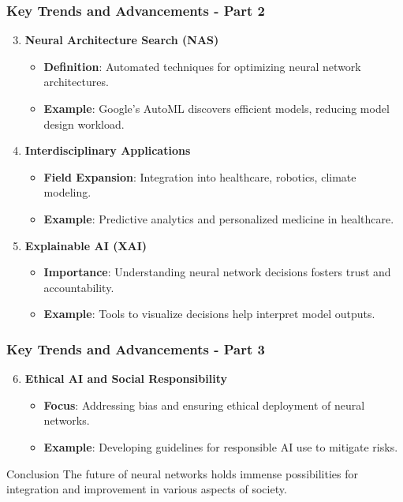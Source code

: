 \documentclass[aspectratio=169]{beamer}
\begin{document}
\begin{frame}[fragile]
    \frametitle{Key Trends and Advancements - Part 2}
    \begin{enumerate}
        \setcounter{enumi}{2} %
        \item \textbf{Neural Architecture Search (NAS)}
            \begin{itemize}
                \item \textbf{Definition}: Automated techniques for optimizing neural network architectures.
                \item \textbf{Example}: Google’s AutoML discovers efficient models, reducing model design workload.
            \end{itemize}

        \item \textbf{Interdisciplinary Applications}
            \begin{itemize}
                \item \textbf{Field Expansion}: Integration into healthcare, robotics, climate modeling.
                \item \textbf{Example}: Predictive analytics and personalized medicine in healthcare.
            \end{itemize}
        
        \item \textbf{Explainable AI (XAI)}
            \begin{itemize}
                \item \textbf{Importance}: Understanding neural network decisions fosters trust and accountability.
                \item \textbf{Example}: Tools to visualize decisions help interpret model outputs.
            \end{itemize}
    \end{enumerate}
\end{frame}

\begin{frame}[fragile]
    \frametitle{Key Trends and Advancements - Part 3}
    \begin{enumerate}
        \setcounter{enumi}{5} %
        \item \textbf{Ethical AI and Social Responsibility}
            \begin{itemize}
                \item \textbf{Focus}: Addressing bias and ensuring ethical deployment of neural networks.
                \item \textbf{Example}: Developing guidelines for responsible AI use to mitigate risks.
            \end{itemize}
    \end{enumerate}

    \begin{block}{Conclusion}
        The future of neural networks holds immense possibilities for integration and improvement in various aspects of society.
    \end{block}
\end{frame}
\end{document}
